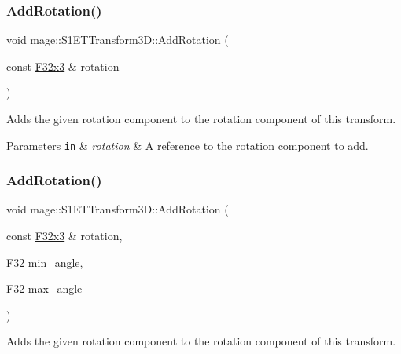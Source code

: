 \subsubsection{\texorpdfstring{Add\+Rotation()}{AddRotation()}\hspace{0.1cm}{\footnotesize\ttfamily [3/6]}}
{\footnotesize\ttfamily void mage\+::\+S1\+E\+T\+Transform3\+D\+::\+Add\+Rotation (\begin{DoxyParamCaption}\item[{const \mbox{\hyperlink{namespacemage_a1e3c7a882af461f161caa1cbddaf1fa2}{F32x3}} \&}]{rotation }\end{DoxyParamCaption})\hspace{0.3cm}{\ttfamily [noexcept]}}

Adds the given rotation component to the rotation component of this transform.


\begin{DoxyParams}[1]{Parameters}
\mbox{\tt in}  & {\em rotation} & A reference to the rotation component to add. \\
\hline
\end{DoxyParams}
\mbox{\label{classmage_1_1_s1_e_t_transform3_d_a79e7d4df08644d4894a84be74752b1b0}} 
\subsubsection{\texorpdfstring{Add\+Rotation()}{AddRotation()}\hspace{0.1cm}{\footnotesize\ttfamily [4/6]}}
{\footnotesize\ttfamily void mage\+::\+S1\+E\+T\+Transform3\+D\+::\+Add\+Rotation (\begin{DoxyParamCaption}\item[{const \mbox{\hyperlink{namespacemage_a1e3c7a882af461f161caa1cbddaf1fa2}{F32x3}} \&}]{rotation,  }\item[{\mbox{\hyperlink{namespacemage_aa97e833b45f06d60a0a9c4fc22ae02c0}{F32}}}]{min\+\_\+angle,  }\item[{\mbox{\hyperlink{namespacemage_aa97e833b45f06d60a0a9c4fc22ae02c0}{F32}}}]{max\+\_\+angle }\end{DoxyParamCaption})\hspace{0.3cm}{\ttfamily [noexcept]}}

Adds the given rotation component to the rotation component of this transform.


